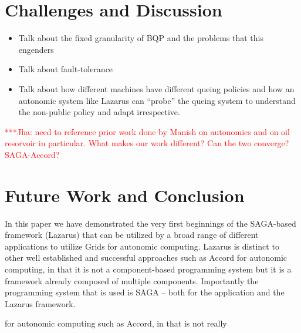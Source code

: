 \documentclass[conference,final]{IEEEtran}
\newcommand{\jha}[0]{}
\newcommand{\jhanote}[1]{ {\textcolor{red} { ***Jha: #1 }}}
\begin{document}

\section{Challenges and Discussion}

\begin{itemize}
\item Talk about the fixed granularity of BQP and the problems that this
engenders
\item Talk about fault-tolerance
\item Talk about how different machines have different queing policies
  and how an autonomic system like Lazarus can ``probe'' the queing
  system to understand the non-public policy and adapt irrespective.
\end{itemize}


\jhanote{need to reference prior work done by Manish on autonomics and
  on oil resorvoir in particular. What makes our work different?  Can
  the two converge? SAGA-Accord?}

\section{Future Work and Conclusion}

In this paper we have demonstrated the very first beginnings of the
SAGA-based framework (Lazarus) that can be utilized by a broad range
of different applications to utilize Grids for autonomic computing.
Lazarus is distinct to other well established and successful
approaches such as Accord for autonomic computing, in that it is not a
component-based programming system but it is a framework already
composed of multiple components. Importantly the programming system
that is used is SAGA -- both for the application and the Lazarus
framework.

for autonomic computing such as Accord, in that is not really 
\end{document}
